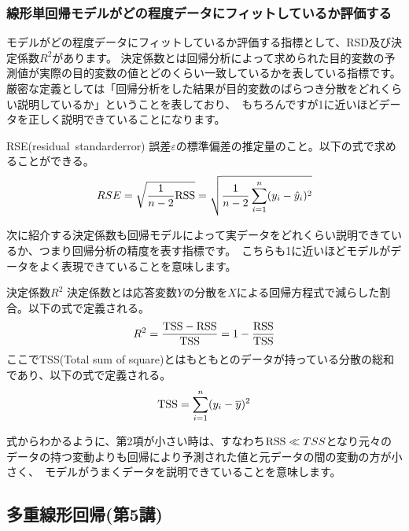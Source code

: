 \documentclass[uplatex]{jsarticle}
\begin{document}
\subsubsection{線形単回帰モデルがどの程度データにフィットしているか評価する}
モデルがどの程度データにフィットしているか評価する指標として、RSD及び決定係数$R^2$があります。
決定係数とは回帰分析によって求められた目的変数の予測値が実際の目的変数の値とどのくらい一致しているかを表している指標です。厳密な定義としては「回帰分析をした結果が目的変数のばらつき分散をどれくらい説明しているか」ということを表しており、\
もちろんですが1に近いほどデータを正しく説明できていることになります。
\begin{itembox}[l]{RSE(residual\ standarderror)}
  誤差$\varepsilon$の標準偏差の推定量のこと。以下の式で求めることができる。
  $$RSE = \sqrt{\frac{1}{n-2}{\rm RSS}} = \sqrt{\frac{1}{n-2}\sum_{i=1}^n(y_i - \hat{y}_i)^2}$$
\end{itembox}
次に紹介する決定係数も回帰モデルによって実データをどれくらい説明できているか、つまり回帰分析の精度を表す指標です。\
こちらも1に近いほどモデルがデータをよく表現できていることを意味します。
\begin{itembox}[l]{決定係数$R^2$}
  決定係数とは応答変数$Y$の分散を$X$による回帰方程式で減らした割合。以下の式で定義される。
  $$R^2 = \frac{{\rm TSS} - {\rm RSS}}{{\rm TSS}} = 1 - \frac{{\rm RSS}}{{\rm TSS}}$$
  ここでTSS(Total sum of square)とはもともとのデータが持っている分散の総和であり、以下の式で定義される。
  $${\rm TSS} = \sum_{i=1}^n (y_i - \overline{y})^2$$
\end{itembox}
式からわかるように、第2項が小さい時は、すなわち${\rm RSS} \ll TSS$となり元々のデータの持つ変動よりも回帰により予測された値と元データの間の変動の方が小さく、\
モデルがうまくデータを説明できていることを意味します。

\subsection{多重線形回帰(第5講)}
\end{document}

